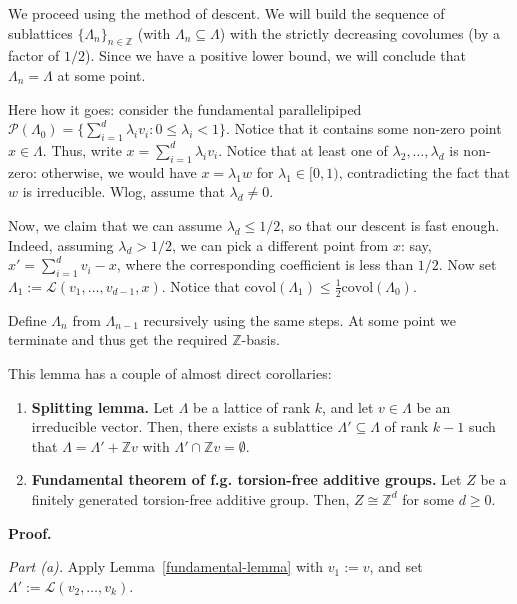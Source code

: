 \documentclass{template-2}
\begin{document}
We proceed using the method of descent. We will build the sequence of
sublattices $\{\Lambda_n\}_{n \in \mathbb{Z}}$ (with $\Lambda_n \subseteq
\Lambda$) with the strictly decreasing covolumes (by a factor of $1/2$). Since
we have a positive lower bound, we will conclude that $\Lambda_n = \Lambda$ at
some point.

Here how it goes: consider the fundamental parallelipiped
$\mathcal{P}(\Lambda_0) = \{\sum_{i=1}^d \lambda_iv_i: 0\leq \lambda_i<1\}$.
Notice that it contains some non-zero point $x \in \Lambda$. Thus, write $x =
\sum_{i=1}^d \lambda_iv_i$. Notice that at least one of
$\lambda_2,\dots,\lambda_d$ is non-zero: otherwise, we would have $x=\lambda_1w$
for $\lambda_1 \in [0,1)$, contradicting the fact that $w$ is irreducible. Wlog,
assume that $\lambda_d \neq 0$. 

Now, we claim that we can assume $\lambda_d \leq 1/2$, so that our descent is
fast enough. Indeed, assuming $\lambda_d > 1/2$, we can pick a different point
from $x$: say, $x' = \sum_{i=1}^d v_i - x$, where the corresponding coefficient
is less than $1/2$. Now set $\Lambda_1 := \mathcal{L}(v_1,\dots,v_{d-1},x)$.
Notice that $\text{covol}(\Lambda_1) \leq \frac{1}{2}\text{covol}(\Lambda_0)$.

Define $\Lambda_n$ from $\Lambda_{n-1}$ recursively using the same steps. At
some point we terminate and thus get the required $\mathbb{Z}$-basis.

\begin{lemma}[Corollary]\label{fundamental-corollary}
    This lemma has a couple of almost direct corollaries:
    \begin{enumerate}
        \item[(a)] \textbf{Splitting lemma.} Let $\Lambda$ be a lattice of rank $k$,
        and let $v \in \Lambda$ be an irreducible vector. Then, there exists a
        sublattice $\Lambda' \subseteq \Lambda$ of rank $k-1$ such that $\Lambda
        = \Lambda' + \mathbb{Z}v$ with $\Lambda' \cap \mathbb{Z}v = \emptyset$.
        \item[(b)] \textbf{Fundamental theorem of f.g. torsion-free additive groups.}
        Let $Z$ be a finitely generated torsion-free additive group. Then, $Z
        \cong \mathbb{Z}^d$ for some $d \geq 0$.
    \end{enumerate}
\end{lemma}

\textbf{Proof.}

\textit{Part (a).} Apply Lemma~\ref{fundamental-lemma} with $v_1 := v$, and 
set $\Lambda' := \mathcal{L}(v_2,\dots,v_k)$.
\end{document}
